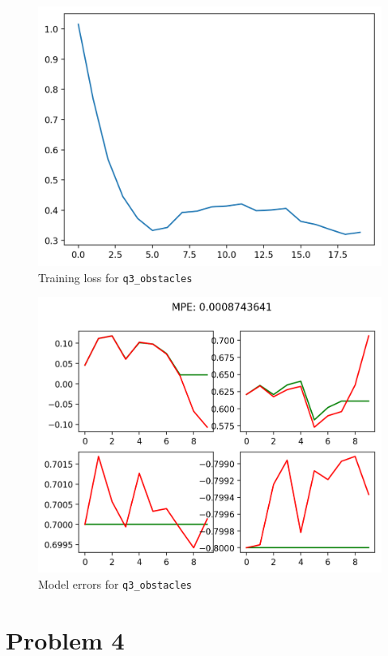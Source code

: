\documentclass[11pt]{article}
\begin{document}
\begin{figure}[htbp]
\centering
\includegraphics[width=.9\linewidth]{./hw2_q3_obstacles_obstacles-ift6163-v0_17-02-2022_21-59-34/itr_0_losses.png}
\caption{Training loss for \texttt{q3\_obstacles}}
\end{figure}

\begin{figure}[htbp]
\centering
\includegraphics[width=.9\linewidth]{./hw2_q3_obstacles_obstacles-ift6163-v0_17-02-2022_21-59-34/itr_0_predictions.png}
\caption{Model errors for \texttt{q3\_obstacles}}
\end{figure}

\clearpage

\section{Problem 4}
\label{sec:orgb50809b}
\end{document}
